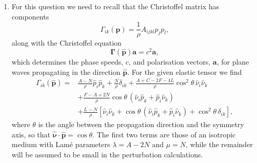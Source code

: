 \documentclass[a4paper,10pt]{paper}
\begin{document}
\begin{enumerate}
\begin{enumerate}
    Nothing in this derivation required the fault to be planar, and the same expression holds for a general fault surface with $\overline{S}_{ij}=\mu(w_{i}\hat{n}_{j}+w_{j}\hat{n}_{i})\delta_{\Sigma}$, the normal then varying over $\Sigma$. This is a form of the \textbf{representation theorem} of Burridge \& Knopoff (1964). The seismic wavefield is a linear superposition of the contributions from the slip at each point of the fault and at each time, with the ``weight'' given by the symmetrised gradient of the Green function, which is the strain at the fault produced by a unit impulsive force at the receiver. Only the tangential slip and the shear modulus on the fault enter, in keeping with part (a). If the fault is small compared with the wavelengths of interest, the Green function varies little over $\Sigma$ and can be taken outside the surface integral. The displacement then depends on the slip only through the \textbf{moment tensor}
    \begin{equation*}
        M_{jk}(t)=\int_{\Sigma}\mu(w_{j}\hat{n}_{k}+w_{k}\hat{n}_{j})\dd S,
    \end{equation*}
    which is the origin of the point-source representation used in the second problem set.
\end{enumerate}

\item For this question we need to recall that the Christoffel matrix has components
\begin{equation*}
    \Gamma_{ik}(\mathbf{p})=\frac{1}{\rho}A_{ijkl}p_{j}p_{l},
\end{equation*}
along with the Christoffel equation
\begin{equation*}
    \bm{\Gamma}(\hat{\mathbf{p}})\mathbf{a}=c^{2}\mathbf{a},
\end{equation*}
which determines the phase speeds, $c$, and polarisation vectors, $\mathbf{a}$, for plane waves propagating in the direction $\hat{\mathbf{p}}$. For the given elastic tensor we find
\begin{align*}
    \Gamma_{ik}(\hat{\mathbf{p}}) = {}&\frac{A-N}{\rho}\hat{p}_{i}\hat{p}_{k}+\frac{N}{\rho}\delta_{ik} + \frac{A+C-2F-4L}{\rho}\cos^{2}\theta\,\hat{\nu}_{i}\hat{\nu}_{k} \\
    &+\frac{F-A+2N}{\rho}\cos\theta\,(\hat{\nu}_{i}\hat{p}_{k}+\hat{p}_{i}\hat{\nu}_{k}) \\
    &+\frac{L-N}{\rho}[\hat{\nu}_{i}\hat{\nu}_{k}+\cos\theta\,(\hat{\nu}_{i}\hat{p}_{k}+\hat{p}_{i}\hat{\nu}_{k})+\cos^{2}\theta\,\delta_{ik}],
\end{align*}
where $\theta$ is the angle between the propagation direction and the symmetry axis, so that $\hat{\bm{\nu}}\cdot\hat{\mathbf{p}}=\cos\theta$. The first two terms are those of an isotropic medium with Lamé parameters $\lambda=A-2N$ and $\mu=N$, while the remainder will be assumed to be small in the perturbation calculations.


\end{enumerate}
\end{document}
